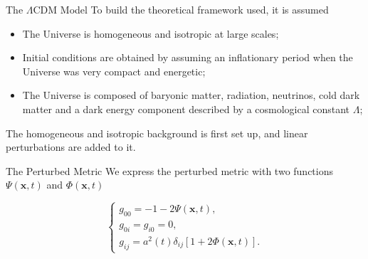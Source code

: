 \documentclass[serif, aspectratio=169]{beamer}
\begin{document}
\begin{frame}{The $\Lambda$CDM Model}
    To build the theoretical framework used, it is assumed

    \begin{itemize}
        \item The Universe is homogeneous and isotropic at large scales; %
        \item Initial conditions are obtained by assuming an inflationary period when the Universe was very compact and energetic;
        \item The Universe is composed of baryonic matter, radiation, neutrinos, cold dark matter and a dark energy component described by a cosmological constant $\Lambda$;
    \end{itemize}

    The homogeneous and isotropic background is first set up, and linear perturbations are added to it.
\end{frame}

\begin{frame}{The Perturbed Metric}
	We express the perturbed metric with two functions $\Psi(\mathbf{x},t)$ and $\Phi(\mathbf{x},t)$
	
	\begin{equation}
	\begin{cases}
    		g_{00}=-1-2\Psi(\mathbf{x},t),\\
    		g_{0i}=g_{i0}=0,\\
    		g_{ij}=a^2(t)\delta_{ij}[1+2\Phi(\mathbf{x}, t)].
	\end{cases}
	\end{equation}
\end{frame}

%	
%	
%	
\end{document}
